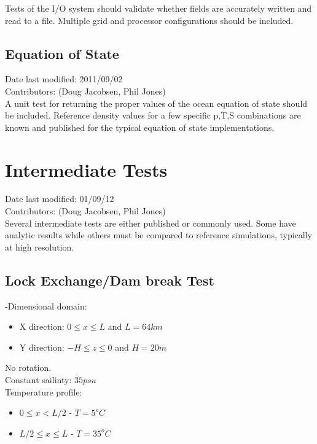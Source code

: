\documentclass[11pt]{report}
\begin{document}
Tests of the I/O system should validate whether fields are accurately written and read to a file.  Multiple grid and processor configurations should be
included.

\subsection{Equation of State}
Date last modified: 2011/09/02 \\
Contributors: (Doug Jacobsen, Phil Jones) \\

A unit test for returning the proper values of the ocean equation of 
state should be included.  Reference density values for a few specific 
p,T,S combinations are known and published for the typical equation of state 
implementations.


\section{Intermediate Tests}
Date last modified: 01/09/12 \\
Contributors: (Doug Jacobsen, Phil Jones) \\

Several intermediate tests are either published or commonly used.  Some
have analytic results while others must be compared to reference
simulations, typically at high resolution.

\subsection{Lock Exchange/Dam break Test}

-Dimensional domain:
\begin{itemize}
	\item X direction: $0 \leq x \leq L$ and $L = 64km$
	\item Y direction: $-H \leq z \leq 0$ and $H = 20m$
\end{itemize}

\noindent No rotation. \\

\noindent Constant sailinty: $35 psu$ \\
\noindent Temperature profile:
\begin{itemize}
	\item $0 \leq x < L/2$ - $T = 5^oC$ 
	\item $L/2 \leq x \leq L$ - $T = 35^oC$
\end{itemize}
\end{document}
